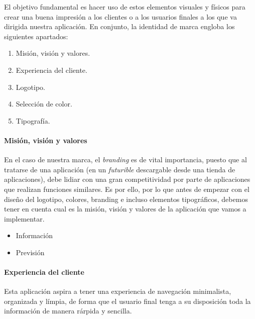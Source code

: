 \documentclass[../ei103948-project-documentation.tex]{subfiles}
\begin{document}
                            El objetivo fundamental es hacer uso de estos elementos visuales y físicos para crear una buena impresión a los clientes o a los usuarios finales a los que va dirigida nuestra aplicación. En conjunto, la identidad de marca engloba los siguientes apartados:
                                \begin{enumerate}
                                    \item Misión, visión y valores.
                                    \item Experiencia del cliente.
                                    \item Logotipo.
                                    \item Selección de color.
                                    \item Tipografía.
                                \end{enumerate}
                            
                            \paragraph{Misión, visión y valores}
                            En el caso de nuestra marca, el \textit{branding} es de vital importancia, puesto que al tratarse de una aplicación (en un \textit{futurible} descargable desde una tienda de aplicaciones), debe lidiar con una gran competitividad por parte de aplicaciones que realizan funciones similares. Es por ello, por lo que antes de empezar con el diseño del logotipo, colores, branding e incluso elementos tipográficos, debemos tener en cuenta cual es la misión, visión y valores de la aplicación que vamos a implementar.
                            
                            \begin{itemize}
                                \item Información
                                \item Previsión
                            \end{itemize}
                            
                            \paragraph{Experiencia del cliente}
                            Esta aplicación aspira a tener una experiencia de navegación minimalista, organizada y límpia, de forma que el usuario final tenga a su disposición toda la información de manera rárpida y sencilla. \\
                    
\end{document}
